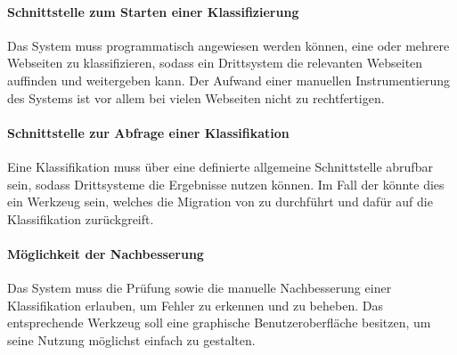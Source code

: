         \paragraph*{Schnittstelle zum Starten einer Klassifizierung}      
        Das System muss programmatisch angewiesen werden können,
        eine oder mehrere Webseiten zu klassifizieren,
        sodass ein Drittsystem die relevanten Webseiten auffinden
        und weitergeben kann.
        Der Aufwand einer manuellen Instrumentierung des Systems ist
        vor allem bei vielen Webseiten nicht zu rechtfertigen.

        \paragraph*{Schnittstelle zur Abfrage einer Klassifikation}
        Eine Klassifikation muss über eine definierte allgemeine
        Schnittstelle abrufbar sein, sodass Drittsysteme die Ergebnisse
        nutzen können.
        Im Fall der {\fernUni} könnte dies ein Werkzeug sein,
        welches die Migration von {\wordpress} zu {\imperia}
        durchführt und dafür auf die Klassifikation zurückgreift.

        \paragraph*{Möglichkeit der Nachbesserung}
        Das System muss die Prüfung sowie die manuelle Nachbesserung
        einer Klassifikation erlauben,
        um Fehler zu erkennen und zu beheben.
        Das entsprechende Werkzeug soll eine graphische Benutzeroberfläche
        besitzen, um seine Nutzung möglichst einfach zu gestalten.
